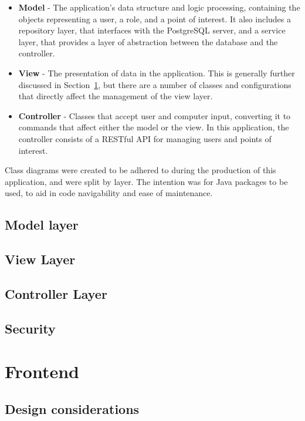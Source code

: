 \begin{itemize}
	\item	\textbf{Model} - The application's data structure and logic processing, containing the objects representing a user, a role, and a point of interest. It also includes a repository layer, that interfaces with the PostgreSQL server, and a service layer, that provides a layer of abstraction between the database and the controller.
	\item	\textbf{View} - The presentation of data in the application. This is generally further discussed in Section~\ref{sec:frontend}, but there are a number of classes and configurations that directly affect the management of the view layer.
	\item	\textbf{Controller} - Classes that accept user and computer input, converting it to commands that affect either the model or the view. In this application, the controller consists of a RESTful API for managing users and points of interest.
\end{itemize}

Class diagrams were created to be adhered to during the production of this application, and were split by layer. The intention was for Java packages to be used, to aid in code navigability and ease of maintenance. %

\subsection{Model layer}


\subsection{View Layer}


\subsection{Controller Layer}


\subsection{Security}

\section{Frontend}
\label{sec:frontend}

\subsection{Design considerations}

